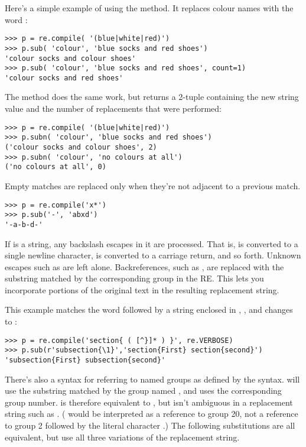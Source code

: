 \documentclass{howto}
\begin{document}
Here's a simple example of using the  method.  It
replaces colour names with the word :

\begin{verbatim}
>>> p = re.compile( '(blue|white|red)')
>>> p.sub( 'colour', 'blue socks and red shoes')
'colour socks and colour shoes'
>>> p.sub( 'colour', 'blue socks and red shoes', count=1)
'colour socks and red shoes'
\end{verbatim}

The  method does the same work, but returns a 2-tuple
containing the new string value and the number of replacements 
that were performed:

\begin{verbatim}
>>> p = re.compile( '(blue|white|red)')
>>> p.subn( 'colour', 'blue socks and red shoes')
('colour socks and colour shoes', 2)
>>> p.subn( 'colour', 'no colours at all')
('no colours at all', 0)
\end{verbatim}

Empty matches are replaced only when they're not
adjacent to a previous match.  

\begin{verbatim}
>>> p = re.compile('x*')
>>> p.sub('-', 'abxd')
'-a-b-d-'
\end{verbatim}

If  is a string, any backslash escapes in it are
processed.  That is,  is converted to a single newline
character,  is converted to a carriage return, and so forth.
Unknown escapes such as  are left alone.  Backreferences,
such as , are replaced with the substring matched by the
corresponding group in the RE.  This lets you incorporate
portions of the original text in the resulting
replacement string.

This example matches the word  followed by a string
enclosed in \samp{\{}, \samp{\}}, and changes  to
:

\begin{verbatim}
>>> p = re.compile('section{ ( [^}]* ) }', re.VERBOSE)
>>> p.sub(r'subsection{\1}','section{First} section{second}')
'subsection{First} subsection{second}'
\end{verbatim}

There's also a syntax for referring to named groups as defined by the
 syntax.   will use the
substring matched by the group named , and 
uses the corresponding group number.  
 is therefore equivalent to , 
but isn't ambiguous in a
replacement string such as .  ( would be
interpreted as a reference to group 20, not a reference to group 2
followed by the literal character .)  The following
substitutions are all equivalent, but use all three variations of the
replacement string.
\end{document}
